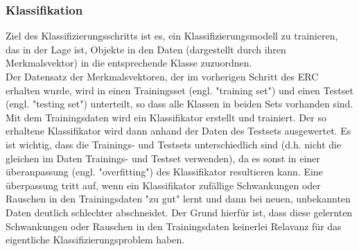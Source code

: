 \subsubsection{Klassifikation} \label{grundlagen-klassifikation-0}

Ziel des Klassifizierungsschritts ist es, ein Klassifizierungsmodell zu trainieren, das in der Lage ist, Objekte in den Daten (dargestellt durch ihren Merkmalsvektor) in die entsprechende Klasse zuzuordnen. \\


Der Datensatz der Merkmalsvektoren, der im vorherigen Schritt des ERC erhalten wurde, wird in einen Trainingsset (engl. "training set") und einen Testset (engl. "testing set") unterteilt, so dass alle Klassen in beiden Sets vorhanden sind. Mit dem Trainingsdaten wird ein Klassifikator erstellt und trainiert. Der so erhaltene Klassifikator wird dann anhand der Daten des Testsets ausgewertet. Es ist wichtig, dass die Trainings- und Testsets unterschiedlich sind (d.h. nicht die gleichen im Daten Trainings- und Testset verwenden), da es sonst in einer {\"u}beranpassung (engl. "overfitting") des Klassifikator resultieren kann. Eine {\"u}berpassung tritt auf, wenn ein Klassifikator zuf{\"a}llige Schwankungen oder Rauschen in den Trainingsdaten "zu gut" lernt und dann bei neuen, unbekannten Daten deutlich schlechter abschneidet. Der Grund hierf{\"u}r ist, dass diese gelernten Schwankungen oder Rauschen in den Trainingsdaten keinerlei Relavanz f{\"u}r das eigentliche Klassifizierungsproblem haben. \\

\begin{figure}[h] 
\label{fig:splitting} \end{figure} \vspace{0.5cm}


